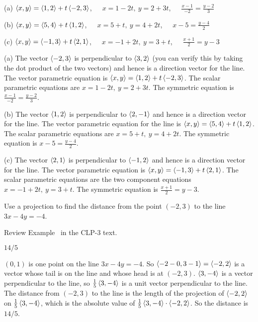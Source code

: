 \begin{answer}
(a) $\left< x,y\right>=\left< 1,2\right>+t\left< -2,3\right> $,\ \ \ 
    $x=1-2t,\ y=2+3t$,\ \ \ 
    $\frac{x-1}{-2}=\frac{y-2}{3}$

(b) $\left< x,y\right>=\left< 5,4\right>+t\left< 1,2\right> $,\ \ \ 
    $x=5+t,\ y=4+2t$,\ \ \ 
    $x-5=\frac{y-4}{2}$

(c) $\left< x,y\right>=\left< -1,3\right>+t\left< 2,1\right> $,\ \ \ 
    $x=-1+2t,\ y=3+t$,\ \ \ 
    $\frac{x+1}{2}=y-3$
\end{answer}

\begin{solution}
(a) The vector $\left< -2,3\right> $ is perpendicular to $\left< 3,2\right> $ (you can
verify this by taking the dot product of the two vectors) and hence is 
a direction vector for the line.
The vector parametric equation is $\left< x,y\right>=\left< 1,2\right>+t\left< -2,3\right> $.
The scalar parametric equations are $x=1-2t,\ y=2+3t$.
The symmetric equation is $\frac{x-1}{-2}=\frac{y-2}{3}$.

(b) The vector $\left< 1,2\right> $ is perpendicular to $\left< 2,-1\right> $ 
 and hence is a direction vector for the line.
The vector parametric equation for the line is 
           $\left< x,y\right>=\left< 5,4\right>+t\left< 1,2\right> $.
The scalar parametric equations are $x=5+t,\ y=4+2t$.
The symmetric equation is $x-5=\frac{y-4}{2}$.

(c) The vector $\left< 2,1\right> $ is perpendicular to $\left< -1,2\right> $  
and hence is a direction vector for the line.
The vector parametric equation is $\left< x,y\right>=\left< -1,3\right>+t\left< 2,1\right> $.
The scalar parametric equations are the two component equations $x=-1+2t,\ y=3+t$.
The symmetric equation is $\frac{x+1}{2}=y-3$.
\end{solution}



\begin{question}
Use a projection to find the distance from the point $(-2,3)$
to the line $3x-4y=-4$.
\end{question}

\begin{hint}
Review Example~ in the CLP-3 text.%
\end{hint}

\begin{answer}
$14/5$
\end{answer}

\begin{solution}
$(0,1)$ is one point on the line $3x-4y=-4$. So $\left<-2-0,3-1\right>
=\left<-2,2\right>$ is a vector whose tail is on the line and whose 
head is at $(-2,3)$. $\left< 3,-4\right>$ is a vector perpendicular to the line,
so $\frac{1}{5}\left< 3,-4\right>$ is a unit vector perpendicular to the line.
The distance from $(-2,3)$ to the line is the length of the projection 
of $\left<-2,2\right>$ on $\frac{1}{5}\left< 3,-4\right>$, which is the absolute value of 
$\frac{1}{5}\left< 3,-4\right>\cdot\left< -2,2\right>$. So the distance is $14/5$.
\end{solution}



